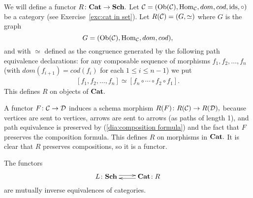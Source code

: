 \documentclass[../main/CT4S-EN-RU]{subfiles}
\begin{document}
\begin{constructionRUS}
\end{constructionRUS}

\begin{constructionENG}
We will define a functor $R\colon{\mathbf{Cat}}\rightarrow{\mathbf{Sch}}.$ Let $\mathcal{C}=(\operatorname{Ob}(\mathcal{C}),\operatorname{Hom}_\mathcal{C},dom,cod,\operatorname{ids},\circ)$ be a category (see Exercise~\ref{exc:cat in set}). Let $R(\mathcal{C})=(G,\simeq)$ where $G$ is the graph $$G=(\operatorname{Ob}(\mathcal{C}),\operatorname{Hom}_\mathcal{C},dom,cod),$$ and with $\simeq$ defined as the congruence generated by the following path equivalence declarations: for any composable sequence of morphisms $f_1,f_2,\ldots,f_n$ (with $dom(f_{i+1})=cod(f_i)$ for each $1\leq i\leq n-1$) we put 
\begin{align}\label{dia:composition formula}
[f_1,f_2,\ldots,f_n]\simeq [f_n\circ\cdots\circ f_2\circ f_1].
\end{align} 
This defines $R$ on objects of ${\mathbf{Cat}}.$ 

A functor $F\colon\mathcal{C}\rightarrow\mathcal{D}$ induces a schema morphism $R(F)\colon R(\mathcal{C})\rightarrow R(\mathcal{D}),$ because vertices are sent to vertices, arrows are sent to arrows (as paths of length 1), and path equivalence is preserved by (\ref{dia:composition formula}) and the fact that $F$ preserves the composition formula. This defines $R$ on morphisms in ${\mathbf{Cat}}.$ It is clear that $R$ preserves compositions, so it is a functor.
\end{constructionENG}

\begin{constructionRUS}
\end{constructionRUS}

\begin{theoremENG}\label{thm:equivalence of categories and schemas}
The functors $$\xymatrix{L\taking\Sch\ar@<.5ex>[r]&\Cat\!:R\ar@<.5ex>[l]}$$ are mutually inverse equivalences of categories.
\end{theoremENG}

\begin{theoremRUS}\label{thm:equivalence of categories and schemas}
\end{theoremRUS}
\end{document}
